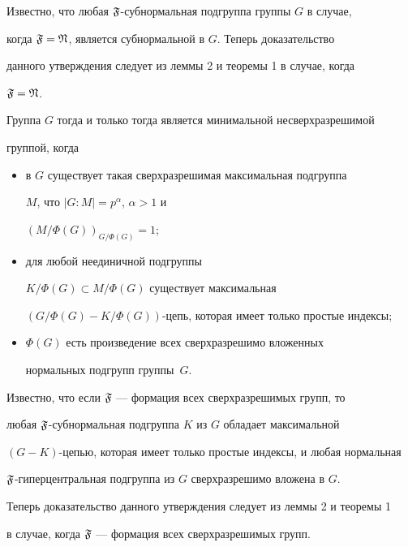 \begin{pf}


Известно, что любая $\frak F$-субнормальная подгруппа группы $G$ в случае,


когда $\frak F=\frak N$, является субнормальной в $G$. Теперь доказательство


данного утверждения следует из леммы 2 и теоремы 1 в случае, когда


$\frak F=\frak N$.


\end{pf}





\begin{cor}


Группа $G$ тогда и только тогда является минимальной несверхразрешимой


группой, когда


\begin{itemize}


\item[1)] в $G$ существует такая сверхразрешимая максимальная подгруппа


$M$, что $|G{:}M|=p^\alpha$, $\alpha>1$ и


$(M/\Phi(G))_{G/\Phi(G)}=1$;


\item[2)] для любой неединичной подгруппы


$K/\Phi(G)\subset M/\Phi(G)$ существует максимальная\linebreak


$(G/\Phi(G)-K/\Phi(G))$-цепь, которая имеет только простые индексы;


\item[3)] $\Phi(G)$ есть произведение всех сверхразрешимо вложенных


нормальных подгрупп группы~$G$.


\end{itemize}


\end{cor}





\begin{pf}


Известно, что если $\frak F$ --- формация всех сверхразрешимых групп, то


любая $\frak F$-субнормальная подгруппа $K$ из $G$ обладает максимальной


$(G-K)$-цепью, которая имеет только простые индексы, и любая нормальная


$\frak F$-гиперцентральная подгруппа из $G$ сверхразрешимо вложена в $G$.


Теперь доказательство данного утверждения следует из леммы 2 и теоремы 1


в случае, когда $\frak F$ --- формация всех сверхразрешимых групп.


\end{pf}





